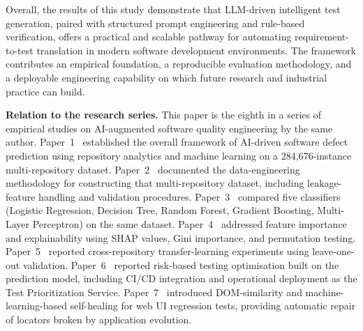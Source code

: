 \documentclass[11pt,letterpaper]{article}
\begin{document}
Overall, the results of this study demonstrate that LLM-driven intelligent test generation, paired with structured prompt engineering and rule-based verification, offers a practical and scalable pathway for automating requirement-to-test translation in modern software development environments. The framework contributes an empirical foundation, a reproducible evaluation methodology, and a deployable engineering capability on which future research and industrial practice can build.

\textbf{Relation to the research series.} This paper is the eighth in a series of empirical studies on AI-augmented software quality engineering by the same author.
Paper~1~\cite{javvadi2024paper1} established the overall framework of AI-driven software defect prediction using repository analytics and machine learning on a 284{,}676-instance multi-repository dataset.
Paper~2~\cite{javvadi2024paper2} documented the data-engineering methodology for constructing that multi-repository dataset, including leakage-feature handling and validation procedures.
Paper~3~\cite{javvadi2024paper3} compared five classifiers (Logistic Regression, Decision Tree, Random Forest, Gradient Boosting, Multi-Layer Perceptron) on the same dataset.
Paper~4~\cite{javvadi2024paper4} addressed feature importance and explainability using SHAP values, Gini importance, and permutation testing.
Paper~5~\cite{javvadi2024paper5} reported cross-repository transfer-learning experiments using leave-one-out validation.
Paper~6~\cite{javvadi2024paper6} reported risk-based testing optimisation built on the prediction model, including CI/CD integration and operational deployment as the Test Prioritization Service.
Paper~7~\cite{javvadi2024paper7} introduced DOM-similarity and machine-learning-based self-healing for web UI regression tests, providing automatic repair of locators broken by application evolution.
\end{document}
